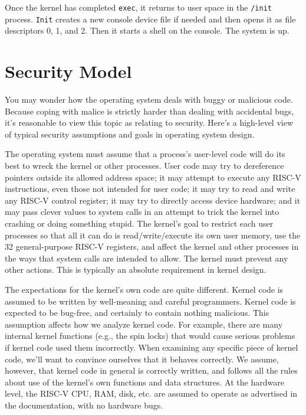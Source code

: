 Once the kernel has completed 
\lstinline{exec},
it returns to user space in
the \lstinline{/init} process.
\lstinline{Init}
creates a new console device file
if needed
and then opens it as file descriptors 0, 1, and 2.
Then it starts a shell on the console.
The system is up.

\section{Security Model}

You may wonder how the operating system deals with buggy or malicious
code. Because coping with malice is strictly harder than dealing with
accidental bugs, it's reasonable to view this topic as relating to
security. Here's a high-level view of typical security assumptions and
goals in operating system design.

The operating system must assume that a process's user-level code will
do its best to wreck the kernel or other processes. User code may try
to dereference pointers outside its allowed address space; it may
attempt to execute any RISC-V instructions, even those not intended
for user code; it may try to read and write any RISC-V control
register; it may try to directly access device hardware;
and it may pass clever values to system calls in an attempt
to trick the kernel into crashing or doing something stupid. The
kernel's goal to restrict each user processes so that all it can do is
read/write/execute its own user memory, use the 32 general-purpose
RISC-V registers, and affect the kernel and other processes in the
ways that system calls are intended to allow. The kernel must prevent
any other actions. This is typically an absolute requirement in kernel
design.

The expectations for the kernel's own code are quite different. Kernel
code is assumed to be written by well-meaning and careful programmers.
Kernel code is expected to be bug-free, and certainly to contain
nothing malicious. This assumption affects how we analyze kernel code.
For example, there are many internal kernel functions (e.g., the spin
locks) that would cause serious problems if kernel code used them
incorrectly. When examining any specific piece of kernel code, we'll
want to convince ourselves that it behaves correctly. We assume,
however, that kernel code in general is correctly written, and follows
all the rules about use of the kernel's own functions and data
structures. At the hardware level, the RISC-V CPU, RAM, disk, etc. are
assumed to operate as advertised in the documentation, with no
hardware bugs.

